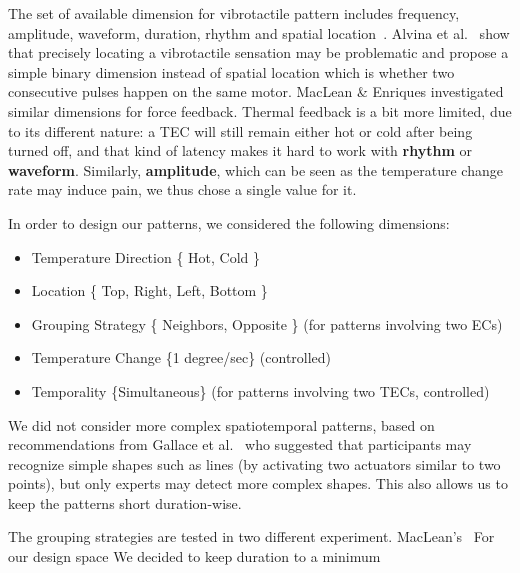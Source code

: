 The set of available dimension for vibrotactile pattern includes frequency, amplitude, waveform, duration, rhythm and spatial location~\cite{Brown2005,Chan2008,MacLean2008}. Alvina et al.~\cite{Alvina2015} show that precisely locating a vibrotactile sensation may be problematic and propose a simple binary dimension instead of spatial location which is whether two consecutive pulses happen on the same motor.
MacLean \& Enriques investigated similar dimensions for force feedback.
Thermal feedback is a bit more limited, due to its different nature: a TEC will still remain either hot or cold after being turned off, and that kind of latency makes it hard to work with \textbf{rhythm} or \textbf{waveform}.
Similarly, \textbf{amplitude}, which can be seen as the temperature change rate may induce pain, we thus chose a single value for it.

In order to design our patterns, we considered the following dimensions:
\begin{itemize}
\item Temperature Direction \{ Hot, Cold \}
\item Location \{ Top, Right, Left, Bottom \}
\item Grouping Strategy \{ Neighbors, Opposite \} (for patterns involving two ECs)
\item Temperature Change \{1 degree/sec\} (controlled)
\item Temporality \{Simultaneous\} (for patterns involving two TECs, controlled)
\end{itemize}

We did not consider more complex spatiotemporal patterns, based on recommendations from Gallace et al.~\cite{Gallace2007} who suggested that participants may recognize simple shapes such as lines (by activating two actuators similar to two points), but only experts may detect more complex shapes. This also allows us to keep the patterns short duration-wise.


The grouping strategies are tested in two different experiment. MacLean's~\cite{MacLean2008}
For our design space
We decided to keep duration to a minimum
